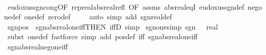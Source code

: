 \begin{isabellebody}
%
\isadelimproof
\ \ %
\endisadelimproof
%
\isatagproof
{}\isamarkupfalse%
\ eudoxus{\isacharunderscore}{\kern0pt}sgn{\isacharunderscore}{\kern0pt}cong{\isacharbrackleft}{\kern0pt}OF\ rep{\isacharunderscore}{\kern0pt}real{\isacharunderscore}{\kern0pt}abs{\isacharunderscore}{\kern0pt}real{\isacharunderscore}{\kern0pt}refl{\isacharcomma}{\kern0pt}\ OF\ assms{\isacharbrackright}{\kern0pt}\ abs{\isacharunderscore}{\kern0pt}real{\isacharunderscore}{\kern0pt}eqI\ eudoxus{\isacharunderscore}{\kern0pt}sgn{\isacharunderscore}{\kern0pt}def\ neg{\isacharunderscore}{\kern0pt}one{\isacharunderscore}{\kern0pt}def\ one{\isacharunderscore}{\kern0pt}def\ zero{\isacharunderscore}{\kern0pt}def\ \isanewline
\ \ \isamarkupfalse%
\ {\isacharparenleft}{\kern0pt}auto\ simp\ add{\isacharcolon}{\kern0pt}\ sgn{\isacharunderscore}{\kern0pt}real{\isacharunderscore}{\kern0pt}def{\isacharparenright}{\kern0pt}%
\endisatagproof
{\isafoldproof}%
%
\isadelimproof
\isanewline
%
\endisadelimproof
\isanewline
{}\isamarkupfalse%
\ sgn{\isacharunderscore}{\kern0pt}pos\ {\isacharequal}{\kern0pt}\ sgn{\isacharunderscore}{\kern0pt}abs{\isacharunderscore}{\kern0pt}real{\isacharunderscore}{\kern0pt}one{\isacharunderscore}{\kern0pt}iff{\isacharbrackleft}{\kern0pt}THEN\ iffD{}{\isacharcomma}{\kern0pt}\ simp{\isacharbrackright}{\kern0pt}\isanewline
\isanewline
{}\isamarkupfalse%
\ sgn{\isacharunderscore}{\kern0pt}one{\isacharbrackleft}{\kern0pt}simp{\isacharbrackright}{\kern0pt}{\isacharcolon}{\kern0pt}\ {\isachardoublequoteopen}sgn\ {\isacharparenleft}{\kern0pt}{}\ {\isacharcolon}{\kern0pt}{\isacharcolon}{\kern0pt}\ real{\isacharparenright}{\kern0pt}\ {\isacharequal}{\kern0pt}\ {}{\isachardoublequoteclose}%
\isadelimproof
\ %
\endisadelimproof
%
\isatagproof
{}\isamarkupfalse%
\ {\isacharparenleft}{\kern0pt}subst\ one{\isacharunderscore}{\kern0pt}def{\isacharparenright}{\kern0pt}\ {\isacharparenleft}{\kern0pt}fastforce\ simp\ add{\isacharcolon}{\kern0pt}\ pos{\isacharunderscore}{\kern0pt}def\ iff{\isacharcolon}{\kern0pt}\ sgn{\isacharunderscore}{\kern0pt}abs{\isacharunderscore}{\kern0pt}real{\isacharunderscore}{\kern0pt}one{\isacharunderscore}{\kern0pt}iff{\isacharparenright}{\kern0pt}%
\endisatagproof
{\isafoldproof}%
%
\isadelimproof
%
\endisadelimproof
\isanewline
\isanewline
{}\isamarkupfalse%
\ sgn{\isacharunderscore}{\kern0pt}abs{\isacharunderscore}{\kern0pt}real{\isacharunderscore}{\kern0pt}neg{\isacharunderscore}{\kern0pt}one{\isacharunderscore}{\kern0pt}iff{\isacharcolon}{\kern0pt}\isanewline

\end{isabellebody}
